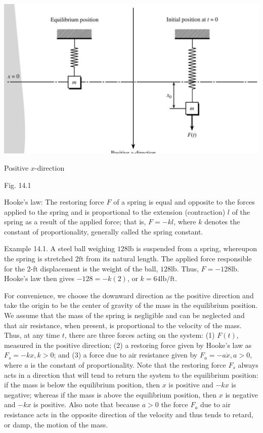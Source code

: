 \documentclass[10pt]{article}
\begin{document}
\begin{center}
\includegraphics[max width=\textwidth]{2024_04_03_5bb5b4275a64cb9887d1g-132}
\end{center}

Positive $x$-direction

Fig. 14.1

Hooke's law: The restoring force $F$ of a spring is equal and opposite to the forces applied to the spring and is proportional to the extension (contraction) $l$ of the spring as a result of the applied force; that is, $F=-k l$, where $k$ denotes the constant of proportionality, generally called the spring constant.

Example 14.1. A steel ball weighing $128 \mathrm{lb}$ is suspended from a spring, whereupon the spring is stretched $2 \mathrm{ft}$ from its natural length. The applied force responsible for the 2-ft displacement is the weight of the ball, $128 \mathrm{lb}$. Thus, $F=-128 \mathrm{lb}$. Hooke's law then gives $-128=-k(2)$, or $k=64 \mathrm{lb} / \mathrm{ft}$.

For convenience, we choose the downward direction as the positive direction and take the origin to be the center of gravity of the mass in the equilibrium position. We assume that the mass of the spring is negligible and can be neglected and that air resistance, when present, is proportional to the velocity of the mass. Thus, at any time $t$, there are three forces acting on the system: (1) $F(t)$, measured in the positive direction; (2) a restoring force given by Hooke's law as $F_{s}=-k x, k>0$; and (3) a force due to air resistance given by $F_{a}=-a \dot{x}, a>0$, where $a$ is the constant of proportionality. Note that the restoring force $F_{s}$ always acts in a direction that will tend to return the system to the equilibrium position: if the mass is below the equilibrium position, then $x$ is positive and $-k x$ is negative; whereas if the mass is above the equilibrium position, then $x$ is negative and $-k x$ is positive. Also note that because $a>0$ the force $F_{a}$ due to air resistance acts in the opposite direction of the velocity and thus tends to retard, or damp, the motion of the mass.
\end{document}
